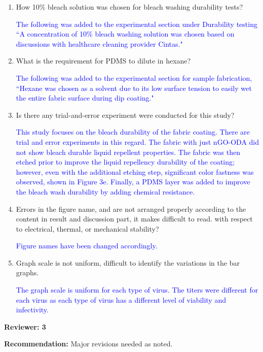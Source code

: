 \documentclass[12pt]{letter}
\newcommand{\blue}[1]{\textcolor{blue}{#1}} %
\begin{document}
\begin{enumerate}
\item   How 10\% bleach solution was chosen for bleach washing durability tests?

\blue{The following was added to the experimental section under Durability testing ``A concentration of 10\% bleach washing solution was chosen based on discussions with healthcare cleaning provider Cintas."}

\item   What is the requirement for PDMS to dilute in hexane?

\blue{The following was added to the experimental section for sample fabrication, ``Hexane was chosen as a solvent due to its low surface tension to easily wet the entire fabric surface during dip coating."}

\item       Is there any trial-and-error experiment were conducted for this study?

\blue{ This study focuses on the bleach durability of the fabric coating. There are trial and error experiments in this regard. The fabric with just nGO-ODA did not show bleach durable liquid repellent properties. The fabric was then etched prior to improve the liquid repellency durability of the coating; however, even with the additional etching step, significant color fastness was observed, shown in Figure 3e. Finally, a PDMS layer was added to improve the bleach wash durability by adding chemical resistance. }

\item       Errors in the figure name, and are not arranged properly according to the content in result and discussion part, it makes difficult to read.
with respect to electrical, thermal, or mechanical stability?

\blue{Figure names have been changed accordingly.}

\item  Graph scale is not uniform, difficult to identify the variations in the bar graphs.

\blue{The graph scale is uniform for each type of virus. The titers were different for each virus as each type of virus has a different level of viability and infectivity. }

\end{enumerate}

\newpage
\textbf{Reviewer: 3}

\textbf{Recommendation:} Major revisions needed as noted.
\end{document}
